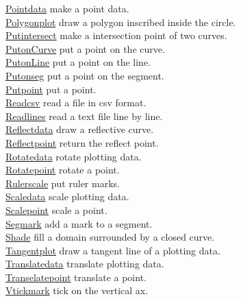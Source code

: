 \documentclass[papersize,a4paper,12pt]{article}
\begin{document}
\begin{tabbing}
\hyperlink{pointdata}{Pointdata} \> make a point data.\\
\hyperlink{polygonplot}{Polygonplot} \> draw a polygon inscribed inside the circle.\\
\hyperlink{putintersect}{Putintersect} \> make a intersection point of two curves.\\
\hyperlink{putoncurve}{PutonCurve} \> put a point on the curve.\\
\hyperlink{putonline}{PutonLine} \> put a point on the line.\\
\hyperlink{putonSeg}{Putonseg} \> put a point on the segment.\\
\hyperlink{putpoint}{Putpoint} \> put a point.\\
\hyperlink{readcsv}{Readcsv} \> read a file in csv format.\\
\hyperlink{readlines}{Readlines} \> read a text file line by line.\\
\hyperlink{reflectdata}{Reflectdata} \> draw a reflective curve.\\
\hyperlink{reflectpoint}{Reflectpoint} \> return the reflect point.\\
\hyperlink{rotatedata}{Rotatedata} \> rotate plotting data.\\
\hyperlink{rotatepoint}{Rotatepoint} \> rotate a point.\\
\hyperlink{rulerscale}{Rulerscale} \> put ruler marks.\\
\hyperlink{scaledata}{Scaledata} \> scale plotting data.\\
\hyperlink{scalepoint}{Scalepoint} \> scale a point.\\
\hyperlink{segmark}{Segmark} \> add a mark to a segment.\\
\hyperlink{shade}{Shade} \> fill a domain surrounded by a closed curve.\\
\hyperlink{tangentplot}{Tangentplot} \> draw a tangent line of a plotting data.\\
\hyperlink{translatedata}{Translatedata} \> translate plotting data.\\
\hyperlink{translatepoint}{Transelatepoint} \> translate a point.\\
\hyperlink{vtickmark}{Vtickmark} \> tick on the vertical ax.\\


\end{tabbing}
\end{document}
